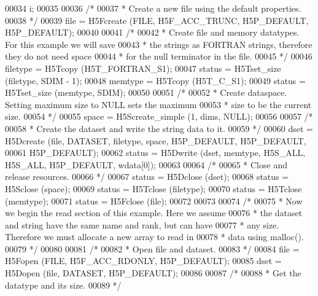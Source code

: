 \begin{DoxyCode}
00034                 i;
00035 
00036     \textcolor{comment}{/*}
00037 \textcolor{comment}{     * Create a new file using the default properties.}
00038 \textcolor{comment}{     */}
00039     file = H5Fcreate (FILE, H5F\_ACC\_TRUNC, H5P\_DEFAULT, H5P\_DEFAULT);
00040 
00041     \textcolor{comment}{/*}
00042 \textcolor{comment}{     * Create file and memory datatypes.  For this example we will save}
00043 \textcolor{comment}{     * the strings as FORTRAN strings, therefore they do not need space}
00044 \textcolor{comment}{     * for the null terminator in the file.}
00045 \textcolor{comment}{     */}
00046     filetype = H5Tcopy (H5T\_FORTRAN\_S1);
00047     status = H5Tset\_size (filetype, SDIM - 1);
00048     memtype = H5Tcopy (H5T\_C\_S1);
00049     status = H5Tset\_size (memtype, SDIM);
00050 
00051     \textcolor{comment}{/*}
00052 \textcolor{comment}{     * Create dataspace.  Setting maximum size to NULL sets the maximum}
00053 \textcolor{comment}{     * size to be the current size.}
00054 \textcolor{comment}{     */}
00055     space = H5Screate\_simple (1, dims, NULL);
00056 
00057     \textcolor{comment}{/*}
00058 \textcolor{comment}{     * Create the dataset and write the string data to it.}
00059 \textcolor{comment}{     */}
00060     dset = H5Dcreate (file, DATASET, filetype, space, H5P\_DEFAULT, H5P\_DEFAULT,
00061                 H5P\_DEFAULT);
00062     status = H5Dwrite (dset, memtype, H5S\_ALL, H5S\_ALL, H5P\_DEFAULT, wdata[0]);
00063 
00064     \textcolor{comment}{/*}
00065 \textcolor{comment}{     * Close and release resources.}
00066 \textcolor{comment}{     */}
00067     status = H5Dclose (dset);
00068     status = H5Sclose (space);
00069     status = H5Tclose (filetype);
00070     status = H5Tclose (memtype);
00071     status = H5Fclose (file);
00072 
00073 
00074     \textcolor{comment}{/*}
00075 \textcolor{comment}{     * Now we begin the read section of this example.  Here we assume}
00076 \textcolor{comment}{     * the dataset and string have the same name and rank, but can have}
00077 \textcolor{comment}{     * any size.  Therefore we must allocate a new array to read in}
00078 \textcolor{comment}{     * data using malloc().}
00079 \textcolor{comment}{     */}
00080 
00081     \textcolor{comment}{/*}
00082 \textcolor{comment}{     * Open file and dataset.}
00083 \textcolor{comment}{     */}
00084     file = H5Fopen (FILE, H5F\_ACC\_RDONLY, H5P\_DEFAULT);
00085     dset = H5Dopen (file, DATASET, H5P\_DEFAULT);
00086 
00087     \textcolor{comment}{/*}
00088 \textcolor{comment}{     * Get the datatype and its size.}
00089 \textcolor{comment}{     */}

\end{DoxyCode}

